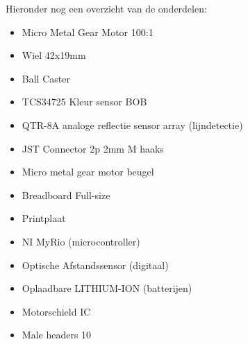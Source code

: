 \documentclass[twoside,kulak]{kulakreport} %
\begin{document}
	Hieronder nog een overzicht van de onderdelen:
	\begin{itemize}
		\item Micro Metal Gear Motor 100:1
		\item Wiel 42x19mm
		\item Ball Caster
		\item TCS34725 Kleur sensor BOB 
		\item QTR-8A analoge reflectie sensor array (lijndetectie)
		\item JST Connector 2p 2mm M haaks
		\item Micro metal gear motor beugel
		\item Breadboard Full-size
		\item Printplaat
		\item NI MyRio (microcontroller)
		\item Optische Afstandssensor (digitaal)
		\item Oplaadbare LITHIUM-ION (batterijen)
		\item Motorschield IC
		\item Male headers 10
	\end{itemize}
\end{document}
